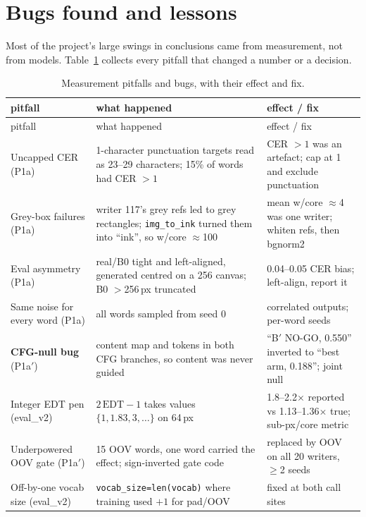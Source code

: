 \documentclass[10.5pt,a4paper]{article}
\newcommand{\Bp}{B$'$}
\begin{document}
\section{Bugs found and lessons}
\label{sec:bugs}

Most of the project's large swings in conclusions came from measurement, not from models. Table~\ref{tab:pitfalls} collects
every pitfall that changed a number or a decision.

\begin{longtable}{@{}p{3.5cm}p{6.6cm}p{5.4cm}@{}}
\caption{Measurement pitfalls and bugs, with their effect and fix.}\label{tab:pitfalls}\\
\toprule
pitfall & what happened & effect / fix \\
\midrule
\endfirsthead
\toprule
pitfall & what happened & effect / fix \\
\midrule
\endhead
\bottomrule
\endfoot
Uncapped CER (P1a) & 1-character punctuation targets read as 23--29 characters; 15\% of words had CER $>1$ & CER $>1$ was an artefact; cap at 1 and exclude punctuation \\
Grey-box failures (P1a) & writer 117's grey refs led to grey rectangles; \texttt{img\_to\_ink} turned them into ``ink'', so w/core $\approx$100 & mean w/core $\approx$4 was one writer; whiten refs, then bgnorm2 \\
Eval asymmetry (P1a) & real/B0 tight and left-aligned, generated centred on a 256 canvas; B0 $>$256\,px truncated & 0.04--0.05 CER bias; left-align, report it \\
Same noise for every word (P1a) & all words sampled from seed 0 & correlated outputs; per-word seeds \\
\textbf{CFG-null bug} (P1a$'$) & content map and tokens in both CFG branches, so content was never guided & ``\Bp{} NO-GO, 0.550'' inverted to ``best arm, 0.188''; joint null \\
Integer EDT pen (eval\_v2) & $2\,\mathrm{EDT}-1$ takes values $\{1,1.83,3,\dots\}$ on 64\,px & 1.8--2.2$\times$ reported vs 1.13--1.36$\times$ true; sub-px/core metric \\
Underpowered OOV gate (P1a$'$) & 15 OOV words, one word carried the effect; sign-inverted gate code & replaced by OOV on all 20 writers, $\ge$2 seeds \\
Off-by-one vocab size (eval\_v2) & \texttt{vocab\_size=len(vocab)} where training used $+1$ for pad/OOV & fixed at both call sites \\

\end{longtable}
\end{document}
